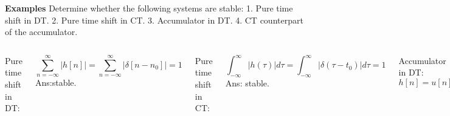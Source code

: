 \begin{frame}{}
    \noindent\textbf{Examples} Determine whether the following systems are stable: 1. Pure time shift in DT. 2. Pure time shift in CT. 3. Accumulator in DT. 4. CT counterpart of the accumulator.

    {
        \begin{columns}[totalwidth=\textwidth]
            Pure time shift in DT:\par
            \begin{equation*}
                \sum_{n=-\infty}^{\infty}|h[n]| = \sum_{n=-\infty}^{\infty}|\delta[n-n_0]| = 1
            \end{equation*}
            \pause
            Ans:\textcolor{EntcSlate}{stable.}\par
            \pause
            Pure time shift in CT:\par
            \begin{equation*}
                \int_{-\infty}^{\infty}|h(\tau)|d\tau = \int_{-\infty}^{\infty}|\delta(\tau- t_0)|d\tau = 1
            \end{equation*}
            \pause
            Ans: \textcolor{EntcSlate}{stable.}\par
            Accumulator in DT: $h[n] = u[n]$\par
            \begin{equation*}
                \sum_{n=-\infty}^{\infty}|u[n]| = \sum_{n=0}^{\infty}|u[n]| = \infty
            \end{equation*}
            \pause
            Ans: \textcolor{DarkRed}{unstable.}
            \pause

            CT counterpart of the accumulator:
            \begin{equation*}
                y(t) = \int_{-\infty}^{t}x(\tau)d\tau
            \end{equation*}
            The impulse response of the integrator can be found by letting $x(t) = \delta(t)$:
            \begin{equation*}
                h(t) = \int_{-\infty}^{t}\delta(\tau)d\tau = u(t).
            \end{equation*}
            \begin{equation*}
                \int_{-\infty}^{\infty}|u(\tau)|d\tau = \int_{0}^{\infty}d\tau = \infty
            \end{equation*}
            \pause
            Ans: \textcolor{DarkRed}{unstable.}
        \end{columns}
    }
\end{frame}




